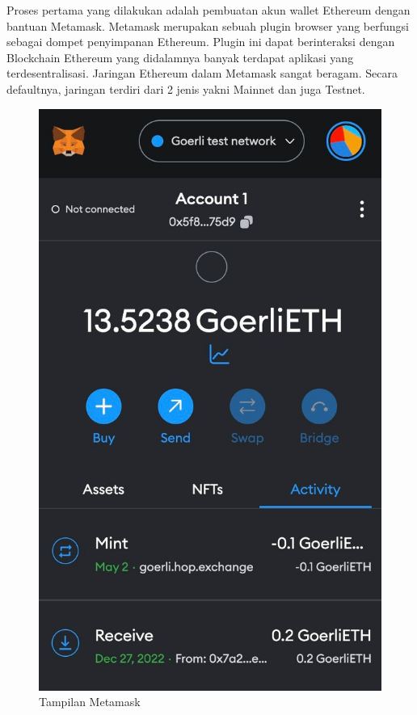 Proses pertama yang dilakukan adalah pembuatan akun wallet Ethereum dengan bantuan Metamask. Metamask merupakan sebuah plugin browser yang berfungsi sebagai
dompet penyimpanan Ethereum. Plugin ini dapat berinteraksi dengan Blockchain Ethereum yang didalamnya banyak terdapat aplikasi yang terdesentralisasi. Jaringan Ethereum dalam Metamask sangat beragam. Secara defaultnya, jaringan terdiri dari 2 jenis yakni Mainnet dan juga Testnet.

\begin{figure}[H]
  \centering

  \includegraphics[scale=0.2]{gambar/tampilan-metamask.jpg}

  \caption{Tampilan Metamask}
  \label{fig:tampilanmetamask}
\end{figure}


